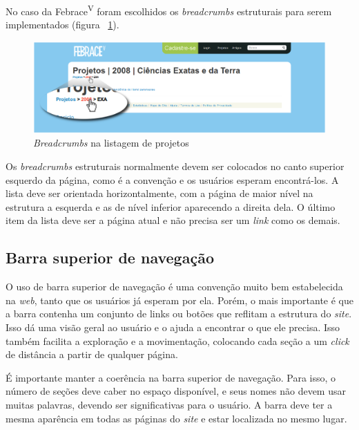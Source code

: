 No caso da Febrace\textsuperscript{V} foram escolhidos os \textit{breadcrumbs} estruturais para serem implementados (figura ~\ref{breadcrumbs}).

    \begin{figure}[h]
        \begin{center}
    \includegraphics[width=1.0\linewidth]{arquivos/breadcrumbs.png}
        \end{center}
        \caption{\textit{Breadcrumbs} na listagem de projetos}
        \label{breadcrumbs}
    \end{figure}

Os \textit{breadcrumbs} estruturais normalmente devem ser colocados no canto superior esquerdo da página, como é a convenção e os usuários esperam encontrá-los. A lista deve ser orientada horizontalmente, com a página de maior nível na estrutura a esquerda e as de nível inferior aparecendo a direita dela. O último item da lista deve ser a página atual e não precisa ser um \textit{link} como os demais.

\subsection{Barra superior de navegação}

O uso de barra superior de navegação é uma convenção muito bem estabelecida na \textit{web}, tanto que os usuários já esperam por ela. Porém, o mais importante é que a barra contenha um conjunto de links ou botões que reflitam a estrutura do \textit{site}. Isso dá uma visão geral ao usuário e o ajuda a encontrar o que ele precisa. Isso também facilita a exploração e a movimentação, colocando cada seção a um \textit{click} de distância a partir de qualquer página.

É importante manter a coerência na barra superior de navegação. Para isso, o número de seções deve caber no espaço disponível, e seus nomes não devem usar muitas palavras, devendo ser significativas para o usuário. A barra deve ter a mesma aparência em todas as páginas do \textit{site} e estar localizada no mesmo lugar.

